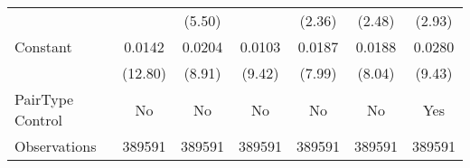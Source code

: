 {\begin{tabular}{l*{6}{c}}
                    &                     &      (5.50)         &                     &      (2.36)         &      (2.48)         &      (2.93)         \\
[1em]
Constant            &      0.0142\sym{***}&      0.0204\sym{***}&      0.0103\sym{***}&      0.0187\sym{***}&      0.0188\sym{***}&      0.0280\sym{***}\\
                    &     (12.80)         &      (8.91)         &      (9.42)         &      (7.99)         &      (8.04)         &      (9.43)         \\
\hline
PairType Control    &          No         &          No         &          No         &          No         &          No         &         Yes         \\
Observations        &      389591         &      389591         &      389591         &      389591         &      389591         &      389591         \\
\hline\hline  \end{tabular}}
